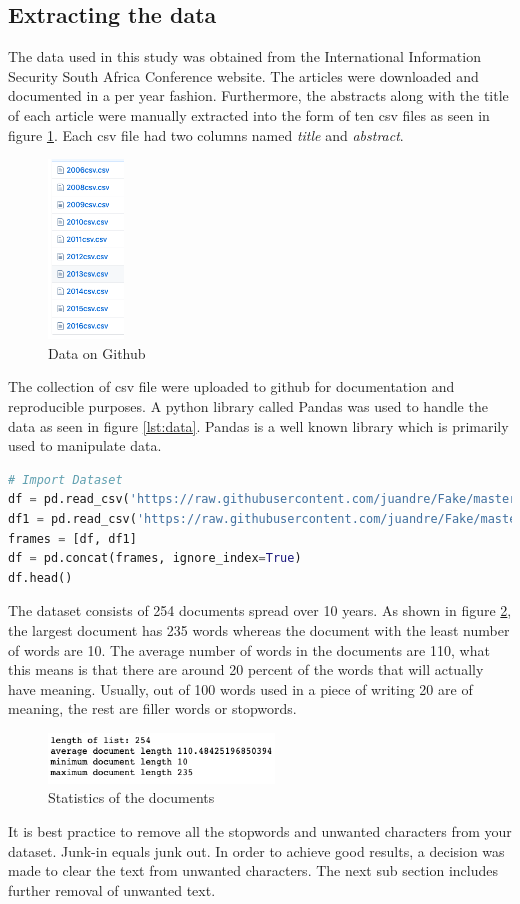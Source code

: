 \subsection{Extracting the data}
The data used in this study was obtained from the International Information Security South Africa Conference website. The articles were downloaded and documented in a per year fashion. Furthermore, the abstracts along with the title of each article were manually extracted into the form of ten csv files as seen in figure \ref{fig:github}. Each csv file had two columns named \textit{title} and \textit{abstract}.
\begin{figure}[h!]
\centering
\includegraphics[width=2cm]{./figures/github.png}
\caption{Data on Github}
\label{fig:github}
\end{figure}
The collection of csv file were uploaded to github for documentation and reproducible purposes. A python library called Pandas was used to handle the data as seen in figure \ref{lst:data}. Pandas is a well known library which is primarily used to manipulate data. 
\begin{lstlisting}[language=Python, label={lst:data}, caption=Importing data to the system]
# Import Dataset
df = pd.read_csv('https://raw.githubusercontent.com/juandre/Fake/master/2006csv.csv', usecols = ['abstracts','title'])
df1 = pd.read_csv('https://raw.githubusercontent.com/juandre/Fake/master/2008csv.csv', usecols = ['abstracts','title'])
frames = [df, df1]
df = pd.concat(frames, ignore_index=True)
df.head()
\end{lstlisting}
The dataset consists of 254 documents spread over 10 years. As shown in figure \ref{fig:data}, the largest document has 235 words whereas the document with the least number of words are 10. The average number of words in the documents are 110, what this means is that there are around 20 percent of the words that will actually have meaning. Usually, out of 100 words used in a piece of writing 20 are of meaning, the rest are filler words or stopwords.
\begin{figure}[h!]
\centering
\includegraphics[width=6cm]{./figures/docstats.png}
\caption{Statistics of the documents}
\label{fig:data}
\end{figure}
It is best practice to remove all the stopwords and unwanted characters from your dataset. Junk-in equals junk out. In order to achieve good results, a decision was made to clear the text from unwanted characters. The next sub section includes further removal of unwanted text.

